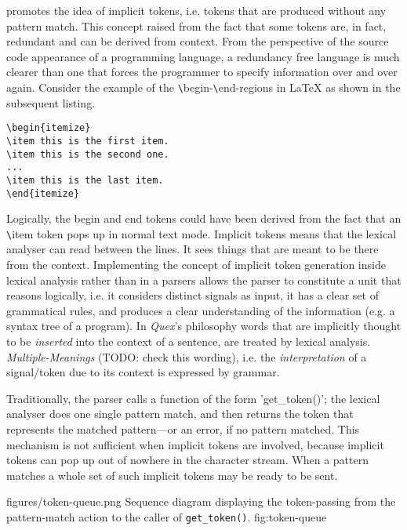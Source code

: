 {\Quex} promotes the idea of implicit tokens, i.e. tokens that are produced
without any pattern match. This concept raised from the fact that some tokens
are, in fact, redundant and can be derived from context. From the perspective
of the source code appearance of a programming language, a redundancy free
language is much clearer than one that forces the programmer to specify
information over and over again. Consider the example of the
\verb|\|begin-\verb|\|end-regions in {\LaTeX} as shown in the subsequent listing. 

\begin{lstlisting}
\begin{itemize}
\item this is the first item.
\item this is the second one.
...
\item this is the last item.
\end{itemize}
\end{lstlisting}

Logically, the begin and end tokens could have been derived from the fact that
an \verb|\|item token pops up in normal text mode.  Implicit tokens means
   that the lexical analyser can read between the lines.  It sees things that
   are meant to be there from the context.  Implementing the concept of
   implicit token generation inside lexical analysis rather than in a parsers
   allows the parser to constitute a unit that reasons logically, i.e. it
   considers distinct signals as input, it has a clear set of grammatical
   rules, and produces a clear understanding of the information (e.g. a syntax
	   tree of a program). In {\it Quex}'s philosophy  words that are
   implicitly thought to be {\it inserted} into the context of a sentence, are
   treated by lexical analysis.  {\it Multiple-Meanings} (TODO: check this
	   wording), i.e. the {\it interpretation} of a signal/token due to its
   context is expressed by grammar. 

Traditionally, the parser calls a function of the form 'get\_token()';
the lexical analyser does one single pattern match, and then returns
the token that represents the matched pattern---or an error, if no pattern matched. 
This mechanism is not sufficient when implicit tokens are involved, because implicit tokens can 
pop up out of nowhere in the character stream. When a pattern matches
a whole set of such implicit tokens may be ready to be sent.

\showpic
{figures/token-queue.png}
{Sequence diagram displaying the token-passing from the pattern-match action to 
    the caller of {\tt get\_token()}.}
{fig:token-queue}

